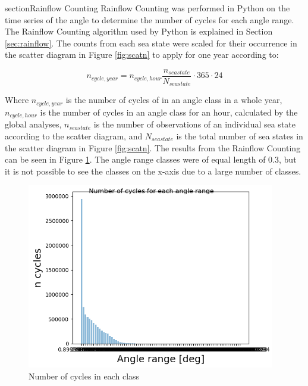 section{Rainflow Counting}
 Rainflow Counting was performed in Python on the time series of the angle to determine the number of cycles for each angle range. The Rainflow Counting algorithm used by Python is explained in Section \ref{sec:rainflow}. The counts from each sea state were scaled for their occurrence in the scatter diagram in Figure \ref{fig:scatn} to apply for one year according to:

\begin{equation}
    n_{cycle,year}=n_{cycle,hour} \frac{n_{seastate}}{N_{seastate}} \cdot 365 \cdot 24 
\end{equation}

\noindent Where $n_{cycle,year}$ is the number of cycles of in an angle class in a whole year, $n_{cycle,hour}$ is the number of cycles in an angle class for an hour, calculated by the global analyses, $n_{seastate}$ is the number of observations of an individual sea state according to the scatter diagram, and $N_{seastate}$ is the total number of sea states in the scatter diagram in Figure \ref{fig:scatn}.\newline
\newline 
\noindent The results from the Rainflow Counting can be seen in Figure \ref{fig:initialcyc}. The angle range classes were of equal length of 0.3, but it is not possible to see the classes on the x-axis due to a large number of classes.

\begin{figure}[H]
\centering
\includegraphics[scale=0.9]{figures/initialcyc}
\caption[Number of cycles in each class]{Number of cycles in each class}
 \label{fig:initialcyc}
\end{figure}

